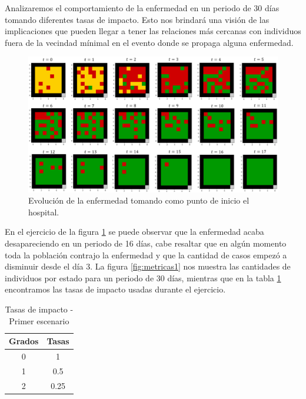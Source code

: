Analizaremos el comportamiento de la enfermedad en un periodo de 30 días tomando diferentes tasas de impacto. Esto nos brindará una visión de las implicaciones que pueden llegar a tener las relaciones más cercanas con individuos fuera de la vecindad mínimal en el evento donde se propaga alguna enfermedad.

\begin{figure}[h]
  \centering
    \includegraphics[width=1\textwidth]{Imagenes/evo1.PNG}
    \caption{Evolución de la enfermedad tomando como punto de inicio el hospital.}
    \label{fig:evo1}
\end{figure}

En el ejercicio de la figura \ref{fig:evo1} se puede observar que la enfermedad acaba desapareciendo en un periodo de 16 días, cabe resaltar que en algún momento toda la población contrajo la enfermedad y que la cantidad de casos empezó a disminuir desde el día 3. La figura \ref{fig:metricas1} nos muestra las cantidades de individuos por estado para un periodo de 30 días, mientras que en la tabla \ref{tab:tasasDeImpacto1} encontramos las tasas de impacto usadas durante el ejercicio.

\newpage

\begin{table}[h]
\begin{center}
\begin{tabular}{| c | c |}
\hline
Grados & Tasas \\ \hline
0 & 1 \\
1 & 0.5 \\
2 & 0.25 \\\hline
\end{tabular}
\caption{Tasas de impacto - Primer escenario}
\label{tab:tasasDeImpacto1}
\end{center}
\end{table}

